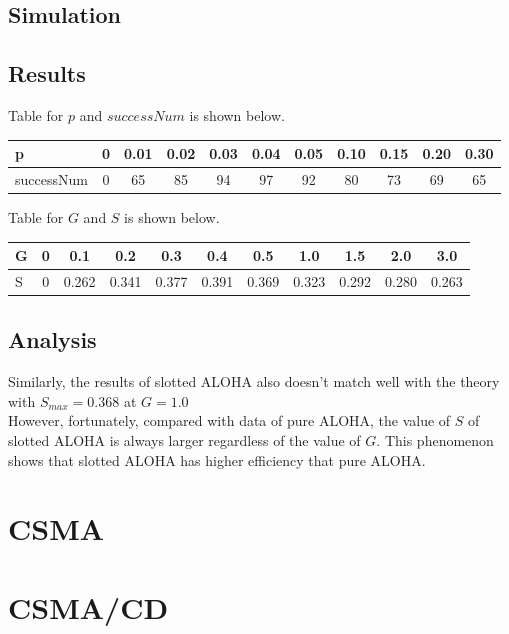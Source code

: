 \documentclass[11pt,a4paper]{report}
\begin{document}
\subsection*{Simulation}


\subsection*{Results}

Table for \(p\) and \(successNum\) is shown below.

\begin{table}[htbp]
\begin{tabular}{lcccccccccc}
\toprule
p & 0 & 0.01 & 0.02  & 0.03 & 0.04 & 0.05 & 0.10 & 0.15 & 0.20 & 0.30 \\
\midrule
successNum & 0 & 65 & 85 & 94 & 97 & 92 & 80 & 73 & 69 & 65 \\
\bottomrule
\end{tabular}
\end{table}


Table for \(G\) and \(S\) is shown below.

\begin{table}[htbp]
\begin{tabular}{lcccccccccc}
\toprule
G & 0 & 0.1 & 0.2  & 0.3 & 0.4 & 0.5 & 1.0 & 1.5 & 2.0 & 3.0 \\
\midrule
S & 0 & 0.262 & 0.341 & 0.377 & 0.391 & 0.369 & 0.323 & 0.292 & 0.280 & 0.263 \\
\bottomrule
\end{tabular}
\end{table}

\subsection*{Analysis}

Similarly, the results of slotted ALOHA also doesn't match well with the theory with \(S_{max} = 0.368\) at \(G = 1.0\) \\

However, fortunately, compared with data of pure ALOHA, the value of \(S\) of slotted ALOHA is always larger regardless of the value of \(G\). This phenomenon shows that slotted ALOHA has higher efficiency that pure ALOHA.

\section*{CSMA}


\section*{CSMA/CD}
\end{document}
